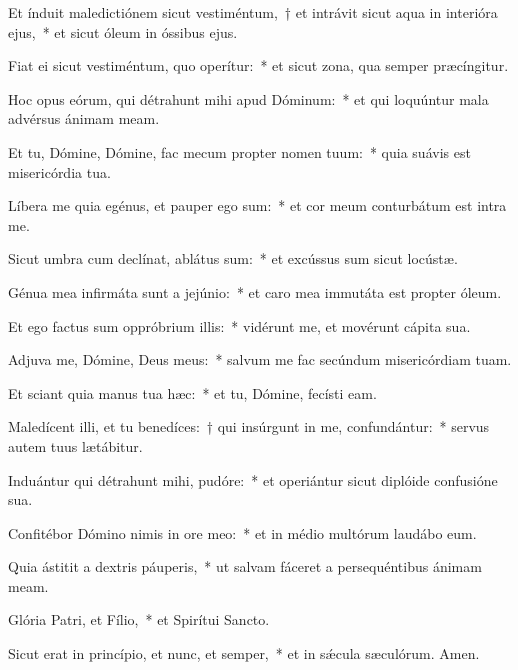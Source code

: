 \item Et índuit maledictiónem sicut vestiméntum,~† et intrávit sicut aqua in interióra ejus,~* et sicut óleum in óssibus ejus.

\item Fiat ei sicut vestiméntum, quo operítur:~* et sicut zona, qua semper præcíngitur.

\item Hoc opus eórum, qui détrahunt mihi apud Dóminum:~* et qui loquúntur mala advérsus ánimam meam.

\item Et tu, Dómine, Dómine, fac mecum propter nomen tuum:~* quia suávis est misericórdia tua.

\item Líbera me quia egénus, et pauper ego sum:~* et cor meum conturbátum est intra me.

\item Sicut umbra cum declínat, ablátus sum:~* et excússus sum sicut locústæ.

\item Génua mea infirmáta sunt a jejúnio:~* et caro mea immutáta est propter óleum.

\item Et ego factus sum oppróbrium illis:~* vidérunt me, et movérunt cápita sua.

\item Adjuva me, Dómine, Deus meus:~* salvum me fac secúndum misericórdiam tuam.

\item Et sciant quia manus tua hæc:~* et tu, Dómine, fecísti eam.

\item Maledícent illi, et tu benedíces:~† qui insúrgunt in me, confundántur:~* servus autem tuus lætábitur.

\item Induántur qui détrahunt mihi, pudóre:~* et operiántur sicut diplóide confusióne sua.

\item Confitébor Dómino nimis in ore meo:~* et in médio multórum laudábo eum.

\item Quia ástitit a dextris páuperis,~* ut salvam fáceret a persequéntibus ánimam meam.

\item Glória Patri, et Fílio,~* et Spirítui Sancto.

\item Sicut erat in princípio, et nunc, et semper,~* et in sǽcula sæculórum. Amen.

